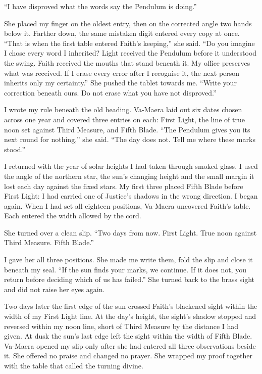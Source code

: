 ``I have disproved what the words say the Pendulum is doing.''\par

She placed my finger on the oldest entry, then on the corrected angle two hands below it. Farther down, the same mistaken digit entered every copy at once. ``That is when the first table entered Faith's keeping,'' she said. ``Do you imagine I chose every word I inherited? Light received the Pendulum before it understood the swing. Faith received the mouths that stand beneath it. My office preserves what was received. If I erase every error after I recognise it, the next person inherits only my certainty.'' She pushed the tablet towards me. ``Write your correction beneath ours. Do not erase what you have not disproved.''\par

I wrote my rule beneath the old heading. Va-Maera laid out six dates chosen across one year and covered three entries on each: First Light, the line of true noon set against Third Measure, and Fifth Blade. ``The Pendulum gives you its next round for nothing,'' she said. ``The day does not. Tell me where these marks stood.''\par

I returned with the year of solar heights I had taken through smoked glass. I used the angle of the northern star, the sun's changing height and the small margin it lost each day against the fixed stars. My first three placed Fifth Blade before First Light: I had carried one of Justice's shadows in the wrong direction. I began again. When I had set all eighteen positions, Va-Maera uncovered Faith's table. Each entered the width allowed by the cord.\par

She turned over a clean slip. ``Two days from now. First Light. True noon against Third Measure. Fifth Blade.''\par

I gave her all three positions. She made me write them, fold the slip and close it beneath my seal. ``If the sun finds your marks, we continue. If it does not, you return before deciding which of us has failed.'' She turned back to the brass sight and did not raise her eyes again.\par

Two days later the first edge of the sun crossed Faith's blackened sight within the width of my First Light line. At the day's height, the sight's shadow stopped and reversed within my noon line, short of Third Measure by the distance I had given. At dusk the sun's last edge left the sight within the width of Fifth Blade. Va-Maera opened my slip only after she had entered all three observations beside it. She offered no praise and changed no prayer. She wrapped my proof together with the table that called the turning divine.\par

